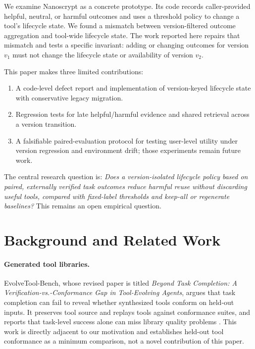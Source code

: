 \documentclass[11pt]{article}
\begin{document}
We examine Nanoscrypt as a concrete prototype. Its code records caller-provided helpful, neutral, or harmful outcomes and uses a threshold policy to change a tool's lifecycle state. We found a mismatch between version-filtered outcome aggregation and tool-wide lifecycle state. The work reported here repairs that mismatch and tests a specific invariant: adding or changing outcomes for version $v_1$ must not change the lifecycle state or availability of version $v_2$.

This paper makes three limited contributions:
\begin{enumerate}[leftmargin=*]
  \item A code-level defect report and implementation of version-keyed lifecycle state with conservative legacy migration.
  \item Regression tests for late helpful/harmful evidence and shared retrieval across a version transition.
  \item A falsifiable paired-evaluation protocol for testing user-level utility under version regression and environment drift; those experiments remain future work.
\end{enumerate}
The central research question is: \emph{Does a version-isolated lifecycle policy based on paired, externally verified task outcomes reduce harmful reuse without discarding useful tools, compared with fixed-label thresholds and keep-all or regenerate baselines?} This remains an open empirical question.

\section{Background and Related Work}
\paragraph{Generated tool libraries.}
EvolveTool-Bench, whose revised paper is titled \emph{Beyond Task Completion: A Verification-vs.-Conformance Gap in Tool-Evolving Agents}, argues that task completion can fail to reveal whether synthesized tools conform on held-out inputs. It preserves tool source and replays tools against conformance suites, and reports that task-level success alone can miss library quality problems \cite{evolvetool}. This work is directly adjacent to our motivation and establishes held-out tool conformance as a minimum comparison, not a novel contribution of this paper.
\end{document}

